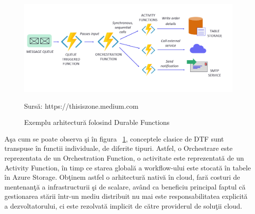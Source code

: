 \documentclass[a4paper,12pt]{report}
\newcommand{\source}[1]{\caption*{Sursă: {#1}} }
\begin{document}
 \begin{figure}[h]
\begin{center}
        \includegraphics[width=1\textwidth]{images/durable-functions}
			 \caption{Exemplu arhitectură folosind Durable Functions}
			 \label{fig:durable-functions}
			 \source {https://thisiszone.medium.com}
\end{center}
\end{figure}
\par Aşa cum se poate observa şi în figura ~\ref{fig:durable-functions}, conceptele clasice de DTF sunt transpuse în functii individuale, de diferite tipuri. Astfel, o Orchestrare este reprezentata de un Orchestration Function, o activitate este reprezentată de un Activity Function, în timp ce starea globală a workflow-ului este stocată în tabele în Azure Storage. Obţinem astfel o arhitectură nativă în cloud, fară costuri de mentenanţă a infrastructurii şi de scalare, având ca beneficiu principal faptul că gestionarea stării într-un mediu distribuit nu mai este responsabilitatea explicită a dezvoltatorului, ci este rezolvată implicit de către providerul de soluţii cloud. 
\end{document}

